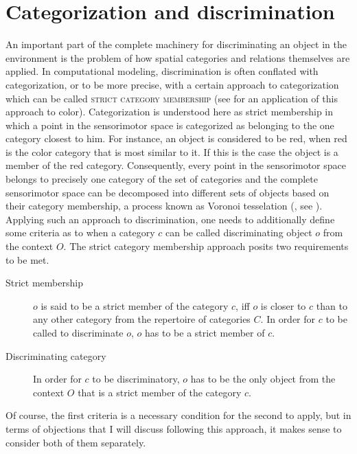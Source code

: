 \section{Categorization and discrimination}
\label{s:categorization+discrimination}
An important part of the complete machinery for discriminating an object
in the environment is the problem of how spatial categories and relations
themselves are applied. In computational modeling, discrimination is often conflated with categorization,
or to be more precise, with a certain approach to categorization which can 
be called \textsc{strict category membership} (see \citealt{belpaeme2007language} 
for an application of this approach to color). Categorization is understood here
as strict membership in which a point in the sensorimotor 
space is categorized as belonging
to the one category closest to him. For instance, an 
object is considered to be red, when red is the color category 
that is most similar to it. If this is the case the object is a member
of the red category. Consequently, every point in the sensorimotor space 
belongs to precisely one category of the set of categories and the
complete sensorimotor space can be decomposed 
into different sets of objects based on their category membership, 
a process known as Voronoi tesselation (\citealt{aurenhammer1991voronoi}, see ).
Applying such an approach to discrimination, one needs to additionally 
define some criteria as to when a category $c$ can be called discriminating
object $o$ from the context $O$. The strict category membership approach
posits two requirements to be met.
\begin{description}
\item[Strict membership] $o$ is said to be a strict member of the category $c$, iff
 $o$ is closer to $c$ than to any other category from the repertoire of categories $C$.
 In order for $c$ to be called to discriminate $o$, $o$ has to be a strict member of $c$.
\item[Discriminating category] In order for $c$ to be discriminatory,
$o$ has to be the only object from the context $O$ that is a strict member of the category
$c$.
\end{description}
Of course, the first criteria is a necessary condition for the second to apply,
but in terms of objections that I will discuss following this approach, 
it makes sense to consider both of them separately. 

